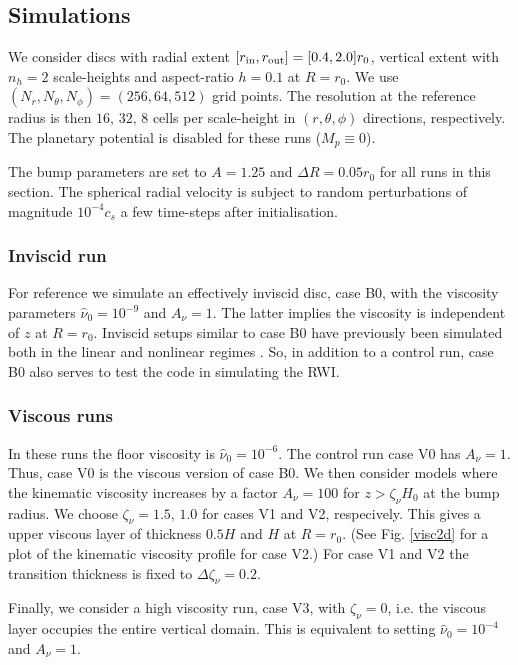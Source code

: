 \subsection{Simulations}
We consider discs with radial extent $[r_\mathrm{in},r_\mathrm{out}]=[0.4,2.0]r_0$,
vertical extent with $n_h=2$ scale-heights and aspect-ratio $h=0.1$ at
$R=r_0$. We use $(N_r, N_\theta,
N_\phi)=(256,64,512)$ grid points. 
The resolution at the reference radius is then
$16,\,32,\,8$ cells per scale-height in $(r,\theta,\phi)$ directions,
respectively. The planetary potential is disabled for these runs
($M_p\equiv 0$).    

The bump parameters are set to $A=1.25$ and $\Delta R = 0.05r_0$ for
all runs in this section. The spherical radial velocity is subject 
to random perturbations of magnitude $10^{-4}c_s$ 
a few time-steps after initialisation. 

\subsubsection{Inviscid run}
For reference we simulate an effectively inviscid disc, case B0,
with the viscosity parameters $\hat{\nu}_0=10^{-9}$ and $A_\nu = 1$.  
The latter implies the viscosity is independent of $z$ at $R=r_0$.   
Inviscid setups similar to case B0 have previously been simulated
both in the linear and nonlinear regimes  \citep{meheut12, lin13}. So,
in addition to a control run, case B0 also serves to test the \pluto
code in simulating the RWI.    

\subsubsection{Viscous runs}
In these runs the floor viscosity is 
$\hat{\nu}_0=10^{-6}$. The control run case V0 has $A_\nu =
1$. Thus, case V0 is the viscous version of case B0.  
We then consider models where the kinematic viscosity increases by
a factor $A_\nu=100$ for $z>\zeta_\nu H_0$ at the bump radius. We
choose $\zeta_\nu=1.5,\,1.0$ for cases V1 and V2, respecively.  This gives a upper 
viscous layer of thickness $0.5H$ and $H$ at $R=r_0$. (See
Fig. \ref{visc2d} for a plot of the kinematic viscosity profile for case V2.) 
For case V1 and V2 the transition thickness is fixed to
$\Delta\zeta_\nu=0.2$.  
 
Finally, we consider a high viscosity run, case V3, with $\zeta_\nu =
0$, i.e. the viscous layer occupies the entire vertical domain. This
is equivalent to setting $\hat{\nu}_0=10^{-4}$ and $A_\nu=1$.  

